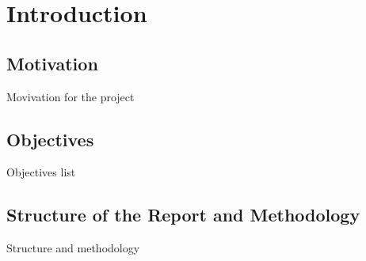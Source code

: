 
\chapter{Introduction}
\label{ch:intro}

\section{Motivation}
\label{ch:intro:motiv}
Movivation for the project


\section{Objectives}
\label{ch:intro:object}

Objectives list

\section{Structure of the Report and Methodology}
\label{ch:intro:method}

Structure and methodology
